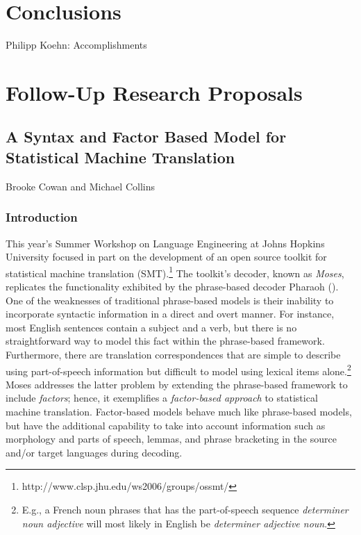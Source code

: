 \documentclass[10pt]{report}
\theoremstyle{plain}
\begin{document}
{\chapter{Conclusions}
{\sc Philipp Koehn: Accomplishments}

\appendix

\chapter{Follow-Up Research Proposals}

\section{A Syntax and Factor Based Model for Statistical Machine Translation}
{\sc Brooke Cowan and Michael Collins}

\newcommand{\gen}{\hbox{GEN}}
\newcommand{\rep}{\bar{\phi}}
\newcommand{\Rep}{{\Phi}}
\newcommand{\reals}{\mbox{\msym R}}
\newcommand{\pav}{\bar{\alpha}}
\newcommand{\ip}[2]{{#1} \cdot {#2}}
\def\parcite#1{(\cite{#1})}
\def\perscite#1{\cite{#1}} %

\subsection{Introduction}
\label{intro}

This year's Summer Workshop on Language Engineering at Johns Hopkins
University focused in part on the development of an open source
toolkit for statistical machine translation
(SMT).\footnote{http://www.clsp.jhu.edu/ws2006/groups/ossmt/} The
toolkit's decoder, known as {\em Moses}, replicates the functionality
exhibited by the phrase-based decoder Pharaoh \parcite{koe:04}. One of
the weaknesses of traditional phrase-based models is their inability
to incorporate syntactic information in a direct and overt manner. For
instance, most English sentences contain a subject and a verb, but
there is no straightforward way to model this fact within the
phrase-based framework. Furthermore, there are translation
correspondences that are simple to describe using part-of-speech
information but difficult to model using lexical items
alone.\footnote{E.g., a French noun phrases that has the
part-of-speech sequence {\em determiner noun adjective} will most
likely in English be {\em determiner adjective noun}.} Moses addresses
the latter problem by extending the phrase-based framework to include
{\em factors}; hence, it exemplifies a {\em factor-based approach} to
statistical machine translation. Factor-based models behave much like
phrase-based models, but have the additional capability to take into
account information such as morphology and parts of speech, lemmas,
and phrase bracketing in the source and/or target languages during
decoding.

}
\end{document}
